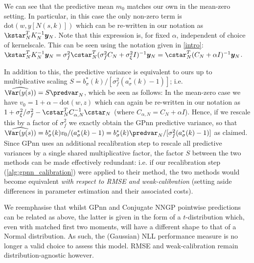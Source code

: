 We can see that the predictive mean \(m_0\) matches our own in the mean-zero setting. In particular, in this case the only non-zero term is \(\textrm{dot}(w, y[N(s,k)])\) which can be re-written in our notation as \(\kstar_N^TK_N^{-1}\bm{y}_N\). Note that this expression is, for fixed \(\alpha\), independent of choice of kernelscale. This can be seen using the notation given in \autoref{intro}: \(\kstar_N^TK_N^{-1}\bm{y}_N = \sigma_f^2\cstar_N^T(\sigma_f^2 C_N + \sigma_\xi^2 I)^{-1}\bm{y}_N = \cstar_N^T(C_N+\alpha I)^{-1}\bm{y}_N\).

In addition to this, the predictive variance is equivalent to ours up to multiplicative scaling \( S = b^*_\sigma(k)/[\sigma_f^2 (a^*_\sigma(k) - 1)] \); i.e. $\widehat{\Var(y(s))} = S \predvar_N$, which be seen as follows: In the mean-zero case we have \(v_0 = 1 + \alpha - \textrm{dot}(w,z)\) which can again be re-written in our notation as \(1 + \sigma_\xi^2/\sigma_f^2 - \cstar_N^TC_{\alpha,N}^{-1}\cstar_N\) (where \(C_{\alpha,N}=C_N+\alpha I\)). Hence, if we rescale this by a factor of \(\sigma_f^2\) we exactly obtain the GPnn predictive variance, so that  $\widehat{\Var(y(s))} = b^*_\sigma(k)v_0/(a^*_\sigma(k) - 1) = b^*_\sigma(k)\predvar_N /[\sigma_f^2 (a^*_\sigma(k) - 1)]$ as claimed. Since GPnn uses an additional recalibration step to rescale all predictive variances by a single shared multiplicative factor, the factor $S$ between the two methods can be made effectively redundant: i.e. if our recalibration step (\autoref{alg:gpnn_calibration}) were applied to their method, the two methods would become equivalent {\it with respect to RMSE and weak-calibration} (setting aside differences in parameter estimation and their associated costs).

We reemphasise that whilst GPnn and Conjugate NNGP pointwise predictions can be related as above, the latter is given in the form of a \(t\)-distribution which, even with matched first two moments, will have a different shape to that of a Normal distribution. As such, the (Gaussian) NLL performance measure is no longer a valid choice to assess this model. RMSE and weak-calibration remain distribution-agnostic however.